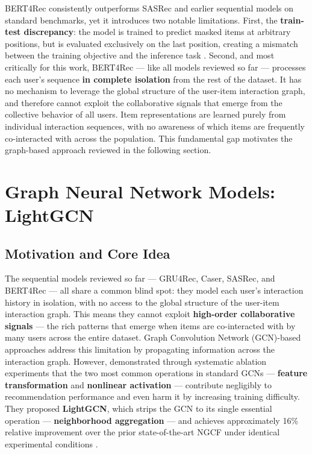 \documentclass[12pt,a4paper]{report}
\newcommand{\textcite}[1]{\citet{#1}}
\newcommand{\parencite}[1]{\citep{#1}}
\begin{document}
BERT4Rec consistently outperforms SASRec and earlier sequential
models on standard benchmarks, yet it introduces two notable
limitations. First, the \textbf{train-test discrepancy}: the model
is trained to predict masked items at arbitrary positions, but is
evaluated exclusively on the last position, creating a mismatch
between the training objective and the inference task
\parencite{sun2019bert4rec}. Second, and most critically for this
work, BERT4Rec --- like all models reviewed so far --- processes
each user's sequence \textbf{in complete isolation} from the rest
of the dataset. It has no mechanism to leverage the global
structure of the user-item interaction graph, and therefore cannot
exploit the collaborative signals that emerge from the collective
behavior of all users. Item representations are learned purely
from individual interaction sequences, with no awareness of which
items are frequently co-interacted with across the population.
This fundamental gap motivates the graph-based approach reviewed
in the following section.

\section{Graph Neural Network Models: LightGCN}
\label{sec:lightgcn}

\subsection{Motivation and Core Idea}

The sequential models reviewed so far --- GRU4Rec, Caser, SASRec,
and BERT4Rec --- all share a common blind spot: they model each
user's interaction history in isolation, with no access to the
global structure of the user-item interaction graph. This means
they cannot exploit \textbf{high-order collaborative signals} ---
the rich patterns that emerge when items are co-interacted with by
many users across the entire dataset. Graph Convolution Network
(GCN)-based approaches address this limitation by propagating
information across the interaction graph. However, \textcite{he2020lightgcn}
demonstrated through systematic ablation experiments that the two
most common operations in standard GCNs --- \textbf{feature
transformation} and \textbf{nonlinear activation} --- contribute
negligibly to recommendation performance and even harm it by
increasing training difficulty. They proposed \textbf{LightGCN},
which strips the GCN to its single essential operation ---
\textbf{neighborhood aggregation} --- and achieves approximately
16\% relative improvement over the prior state-of-the-art NGCF
under identical experimental conditions \parencite{he2020lightgcn}.
\end{document}
